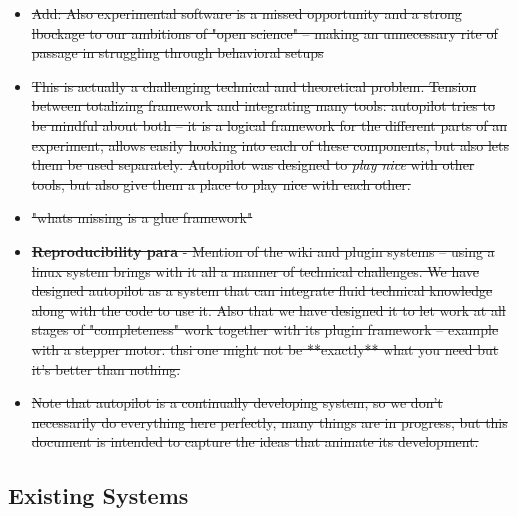 \begin{itemize}
\item \sout{Add: Also experimental software is a missed opportunity and a strong lbockage to our ambitions of "open science" -- making an unnecessary rite of passage in struggling through behavioral setups}
\item \sout{This is actually a challenging technical and theoretical problem. Tension between totalizing framework and integrating many tools: autopilot tries to be mindful about both -- it is a logical framework for the different parts of an experiment, allows easily hooking into each of these components, but also lets them be used separately. Autopilot was designed to \textit{play nice} with other tools, but also give them a place to play nice with each other.}
\item \sout{"whats missing is a glue framework"}
\item \sout{\textbf{Reproducibility para} - Mention of the wiki and plugin systems -- using a linux system brings with it all a manner of technical challenges. We have designed autopilot as a system that can integrate fluid technical knowledge along with the code to use it. Also that we have designed it to let work at all stages of "completeness" work together with its plugin framework -- example with a stepper motor. thsi one might not be **exactly** what you need but it's better than nothing.}
\item \sout{Note that autopilot is a continually developing system, so we don't necessarily do everything here perfectly, many things are in progress, but this document is intended to capture the ideas that animate its development.}
\end{itemize}


\subsection{Existing Systems}

